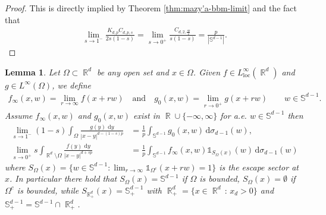 \documentclass[12pt, reqno]{amsart}%
\theoremstyle{plain}  %
\newtheorem{lemma}[theorem]{Lemma}
\theoremstyle{definition}  %
\theoremstyle{remark}
\numberwithin{equation}{section}
\DeclareMathOperator{\R}{\mathbb{R}}
\renewcommand{\d}{\,\mathrm{d}}
\begin{document}
\begin{proof}
This is directly implied by Theorem \ref{thm:mazy'a-bbm-limit} and the fact that
\begin{align*}
\lim_{s\to 1^-} \frac{K_{d,p}C_{d,p,s} }{2s(1-s)}
=\lim_{s\to 0^+} \frac{C_{d,2,\frac{sp}{2}}}{s(1-s)}=\frac{p}{|\mathbb{S}^{d-1}|}.
\end{align*}
\end{proof}
\begin{lemma}
\label{lem:ptwise-s-1-s-asymp}
Let $\Omega \subset \R^d$ be any open set and $x\in \Omega$.
Given  $f\in L^\infty_{\mathrm{loc}}(\R^d)$  and $g\in L^\infty(\Omega)$, we  define
\begin{align*}
f_\infty(x,w)=\lim_{r\to \infty} f(x+rw)\quad \text{and}\quad
g_0(x,w)=\lim_{r\to 0^+} g(x+rw)\qquad w\in \mathbb{S}^{d-1}.
\end{align*}
Assume $f_\infty(x,w)$ and $g_0(x,w)$ exist in $\R\cup \{-\infty,\infty\}$ for a.e. $w\in \mathbb{S}^{d-1}$ then
\begin{align*}
\lim_{s \to 1^-}(1-s) \int_{\Omega} \frac{ g(y)\, \d y}{|x-y|^{d-(1-s)p}}
&= \frac{1}{p} \int_{\mathbb{S}^{d-1}} g_0(x,w)\d\sigma_{d-1}(w),\\
\lim_{s \to 0^+}s \int_{\R^d \setminus \Omega} \frac{ f(y)\, \d y}{|x-y|^{d+sp}}
&= \frac{1}{p} \int_{\mathbb{S}^{d-1}} f_\infty(x,w)\mathds{1}_{S_\Omega(x)} (w)\d\sigma_{d-1}(w)
\end{align*}
where $S_\Omega(x) =
 \{ w \in \mathbb{S}^{d-1} :  \lim_{r\to \infty} \mathds{1}_{\Omega^c}(x+rw)=1\}$ is \emph{ the escape sector at $x$}.  In particular there hold that $S_\Omega(x)= \mathbb{S}^{d-1}$ if $\Omega$ is bounded,  $S_\Omega(x)= \emptyset$ if $\Omega^c$ is bounded, while $S_{\R^d_+}(x)= \mathbb{S}^{d-1}_+$  with $\R^d_+=\{x\in \R^d\,:\, x_d>0\}$ and $\mathbb{S}^{d-1}_+= \mathbb{S}^{d-1}\cap \R^d_+$.
\end{lemma}
\end{document}
